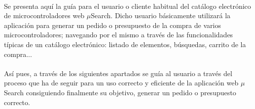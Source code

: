 \paragraph{}Se presenta aquí la guía para el usuario o cliente habitual del catálogo electrónico de microcontroladores web $\mu$Search. Dicho usuario básicamente utilizará la aplicación para generar un pedido o presupuesto de la compra de varios microcontroladores; navegando por el mismo a través de las funcionalidades típicas de un catálogo electrónico: listado de elementos, búsquedas, carrito de la compra...

\paragraph{}Así pues, a través de los siguientes apartados se guía al usuario a través del proceso que ha de seguir para un uso correcto y eficiente de la aplicación web $\mu$Search consiguiendo finalmente su objetivo, generar un pedido o presupuesto correcto.
